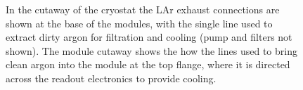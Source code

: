 \begin{figure}[tbp]
	\centering
	\caption[ArgonCube module cryogenic scheme]{In the cutaway of the cryostat the LAr exhaust connections are shown at the base of the modules, with the single line used to extract dirty argon for filtration and cooling (pump and filters not shown). The module cutaway shows the how the lines used to bring clean argon into the module at the top flange, where it is directed across the readout electronics to provide cooling.}
	\label{fig:cryo_scheme}
\end{figure}

